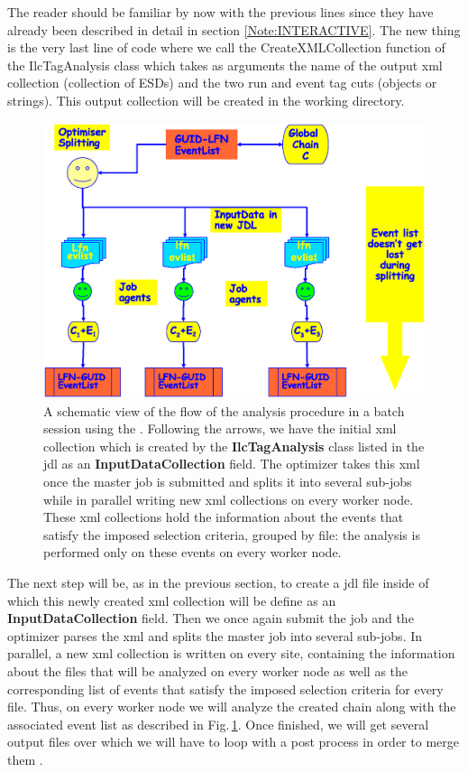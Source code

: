 \noindent The reader should be familiar by now with the previous lines since they have already been described in detail in section \ref{Note:INTERACTIVE}. The new thing is the very last line of code where we call the {\ttfamily CreateXMLCollection} function of the {\ttfamily IlcTagAnalysis} class which takes as arguments the name of the output xml collection (collection of ESDs) and the two run and event tag cuts (objects or strings). This output collection will be created in the working directory.

\begin{figure}[ht!]
\begin{center}
\includegraphics[width=0.7\textheight]{figures/Batch2.eps}
\end{center}
\caption{A schematic view of the flow of the analysis procedure in a batch session using the \tag. Following the arrows, we have the initial xml collection which is created by the {\ttfamily \textbf{IlcTagAnalysis}} class listed in the jdl as an {\ttfamily \textbf{InputDataCollection}} field. The optimizer takes this xml once the master job is submitted and splits it into several sub-jobs while in parallel writing new xml collections on every worker node. These xml collections hold the information about the events that satisfy the imposed selection criteria, grouped by file: the analysis is performed only on these events on every worker node.}
\label{Note:FigAnalsysisFlowBatchTag}
\end{figure}

The next step will be, as in the previous section, to create a jdl file inside of which this newly created xml collection will be define as an {\ttfamily \textbf{InputDataCollection}} field. Then we once again submit the job and the optimizer parses the xml and splits the master job into several sub-jobs. In parallel, a new xml collection is written on every site, containing the information about the files that will be analyzed on every worker node as well as the corresponding list of events that satisfy the imposed selection criteria for every file. Thus, on every worker node we will analyze the created chain along with the associated event list as described in Fig.\,\ref{Note:FigAnalsysisFlowBatchTag}. Once finished, we will get several output files over which we will have to loop with a post process in order to merge them \cite{Note:RefIlcenTutorial,Note:RefEventTagWeb}.

